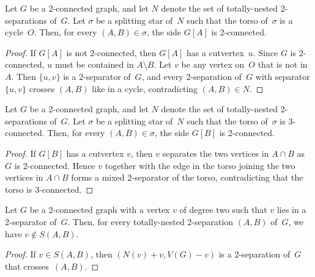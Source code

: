 \documentclass{aic}
\theoremstyle{plain}
\theoremstyle{definition}
\theoremstyle{plain}
\theoremstyle{plain}
\newcommand{\sm}{\setminus}
\begin{document}
\begin{lem}\label{2conAroundCycleTorso}
    Let $G$ be a 2-connected graph, and let $N$ denote the set of totally-nested 2-separations of~$G$.
    Let $\sigma$ be a splitting star of~$N$ such that the torso of~$\sigma$ is a cycle~$O$.
    Then, for every $(A,B)\in\sigma$, the side $G[A]$ is 2-connected.
\end{lem}
\begin{proof}
    If $G[A]$ is not 2-connected, then $G[A]$ has a cutvertex~$u$.
    Since $G$ is 2-connected, $u$ must be contained in $A\sm B$.
    Let $v$ be any vertex on~$O$ that is not in~$A$.
    Then $\{u,v\}$ is a 2-separator of~$G$, and every 2-separation of~$G$ with separator $\{u,v\}$ crosses $(A,B)$ like in a cycle, contradicting $(A,B)\in N$.
\end{proof}

\begin{lem}\label{2conAround3conTorso}
    Let $G$ be a 2-connected graph, and let $N$ denote the set of totally-nested 2-separations of~$G$.
    Let $\sigma$ be a splitting star of~$N$ such that the torso of~$\sigma$ is 3-connected.
    Then, for every $(A,B)\in\sigma$, the side $G[B]$ is 2-connected.
\end{lem}
\begin{proof}
If $G[B]$ has a cutvertex $v$, then $v$ separates the two vertices in $A\cap B$ as $G$ is 2-connected.
Hence $v$ together with the edge in the torso joining the two vertices in $A\cap B$ forms a mixed 2-separator of the torso, contradicting that the torso is 3-connected.
\end{proof}

\begin{fact}\label{DegreeThreeTotallyNested}
    Let $G$ be a 2-connected graph with a vertex $v$ of degree two such that $v$ lies in a 2-separator of~$G$.
    Then, for every totally-nested 2-separation $(A,B)$ of~$G$, we have $v\notin S(A,B)$.
\end{fact}
\begin{proof}
    If $v\in S(A, B)$, then $(N(v)+v,V(G)-v)$ is a 2-separation of~$G$ that crosses~$(A,B)$.
\end{proof}
\end{document}
